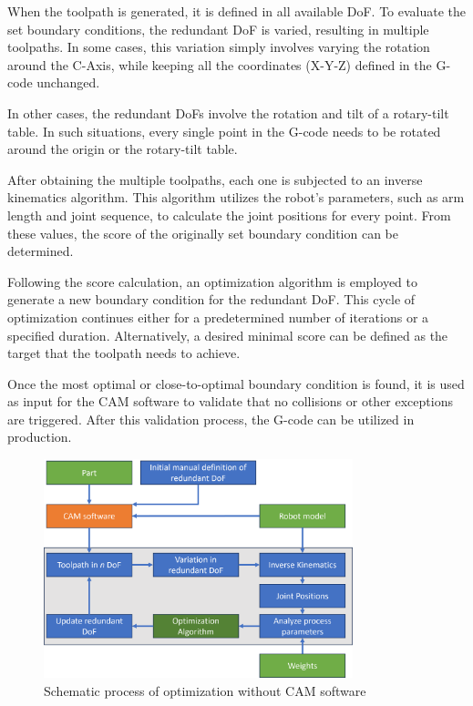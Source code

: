 When the toolpath is generated, it is defined in all available DoF. To evaluate the set boundary conditions, the redundant DoF is varied, resulting in multiple toolpaths. In some cases, this variation simply involves varying the rotation around the C-Axis, while keeping all the coordinates (X-Y-Z) defined in the G-code unchanged.

In other cases, the redundant DoFs involve the rotation and tilt of a rotary-tilt table. In such situations, every single point in the G-code needs to be rotated around the origin or the rotary-tilt table.

After obtaining the multiple toolpaths, each one is subjected to an inverse kinematics algorithm. This algorithm utilizes the robot's parameters, such as arm length and joint sequence, to calculate the joint positions for every point. From these values, the score of the originally set boundary condition can be determined.

Following the score calculation, an optimization algorithm is employed to generate a new boundary condition for the redundant DoF. This cycle of optimization continues either for a predetermined number of iterations or a specified duration. Alternatively, a desired minimal score can be defined as the target that the toolpath needs to achieve.
 

Once the most optimal or close-to-optimal boundary condition is found, it is used as input for the CAM software to validate that no collisions or other exceptions are triggered. After this validation process, the G-code can be utilized in production.

\begin{figure}[H]
	\centerline{\includegraphics[width=0.8\textwidth]{figures/nocam.png}}
	\caption{Schematic process of optimization without CAM software}
	\label{nocam}
\end{figure}

